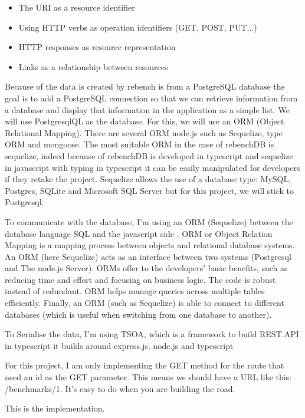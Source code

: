 \documentclass{article}
\begin{document}
\begin{itemize}
    \item The URI as a resource identifier
    \item Using HTTP verbs as operation identifiers (GET, POST, PUT...)
    \item HTTP responses as resource representation
    \item Links as a relationship between resources
\end{itemize}

Because of the data is created by rebench is from a PostgreSQL database the goal is to add a PostgreSQL connection so that we can retrieve information from a database and display that information in the application as a simple list.
We will use PostgresqlQL as the database. For this, we will use an ORM (Object Relational Mapping). There are several ORM node.js such as Sequelize, type ORM and mongoose. The most suitable ORM in the case of rebenchDB is sequelize, indeed because of rebenchDB is developed in typescript and sequelize in javascript with typing in typescript it can be easily manipulated for developers if they retake the project. Sequelize allows the use of a database type: MySQL, Postgres, SQLite and Microsoft SQL Server but for this project, we will stick to Postgresql.

To communicate with the database, I'm using an ORM (Sequelize) between the database language SQL and the javascript side \citep{pereira2016working}. ORM or Object Relation Mapping is a mapping process between objects and relational database systems. An ORM (here Sequelize) acts as an interface between two systems (Postgresql and The node.js Server). ORMs offer to the developers' basic benefits, such as reducing time and effort and focusing on business logic. The code is robust instead of redundant. ORM helps manage queries across multiple tables efficiently. Finally, an ORM (such as Sequelize) is able to connect to different databases (which is useful when switching from one database to another).



To Serialise the data, I'm using TSOA, which is a framework to build REST.API in typescript it builds around express.js, node.js and typescript

For this project, I am only implementing the GET method for the route that need an id as the GET parameter. This means we should have a URL like this: /benchmarks/1. It's easy to do when you are building the road.

This is the implementation.
\end{document}
